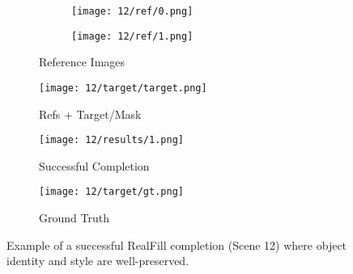 \documentclass{article}
\begin{document}
\begin{figure}[H]
    \centering
    \begin{subfigure}[b]{0.24\linewidth}
        \begin{subfigure}[b]{0.6\linewidth}
            \texttt{[image: 12/ref/0.png]}
        \end{subfigure}
        \begin{subfigure}[b]{0.3\linewidth}
            \texttt{[image: 12/ref/1.png]}
        \end{subfigure}
        \caption{Reference Images}
    \end{subfigure}
    \begin{subfigure}[b]{0.24\linewidth}
        \centering
        \texttt{[image: 12/target/target.png]}
        \caption{Refs + Target/Mask}
    \end{subfigure}
    \hfill
    \begin{subfigure}[b]{0.24\linewidth}
        \centering
        \texttt{[image: 12/results/1.png]} %
        \caption{Successful Completion}
    \end{subfigure}
    \hfill
    \begin{subfigure}[b]{0.24\linewidth}
        \centering
        \texttt{[image: 12/target/gt.png]}
        \caption{Ground Truth}
    \end{subfigure}
    \caption{Example of a successful RealFill completion (Scene 12) where object identity and style are well-preserved.}
    \label{fig:success_example}
\end{figure}
\end{document}
